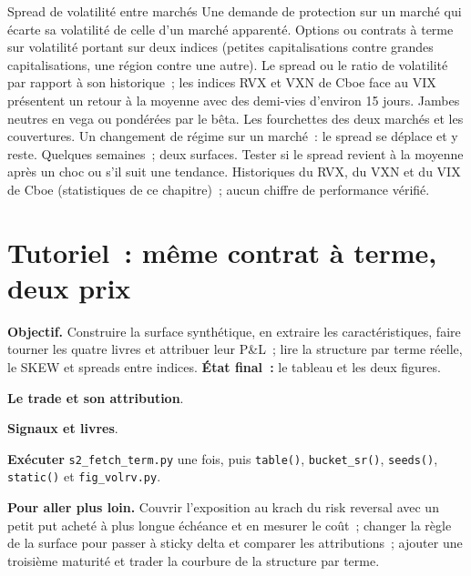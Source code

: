 \begin{strategyfile}{Spread de volatilité entre marchés}\label{strat:s2:skew-and-term-structure-relative-value:cross}
 Une demande de protection sur un marché qui écarte sa volatilité de celle d'un marché apparenté.
 Options ou contrats à terme sur volatilité portant sur deux indices (petites capitalisations contre grandes capitalisations, une région contre une autre).
 Le spread ou le ratio de volatilité par rapport à son historique~; les indices RVX et VXN de Cboe face au VIX présentent un retour à la moyenne avec des demi-vies d'environ 15 jours.
 Jambes neutres en vega ou pondérées par le bêta.
 Les fourchettes des deux marchés et les couvertures.
 Un changement de régime sur un marché~: le spread se déplace et y reste.
 Quelques semaines~; deux surfaces.
 Tester si le spread revient à la moyenne après un choc ou s'il suit une tendance.
 Historiques du RVX, du VXN et du VIX de Cboe (statistiques de ce chapitre)~; aucun chiffre de performance vérifié.
\end{strategyfile}

\section{Tutoriel~: même contrat à terme, deux prix}\label{tut:s2:skew-and-term-structure-relative-value:tut}

\begin{tutorial}
\textbf{Objectif.} Construire la surface synthétique, en extraire les caractéristiques, faire tourner les quatre livres et attribuer leur P\&L~; lire la structure par terme réelle, le SKEW et
spreads entre indices. \textbf{État final~:} le tableau et les deux figures.
\begin{tutsteps}
\item \textbf{Le trade et son attribution}.
\label{lst:s2:skew-and-term-structure-relative-value:pnl}
\item \textbf{Signaux et livres}.
\label{lst:s2:skew-and-term-structure-relative-value:books}
\item \textbf{Exécuter} \texttt{s2\_fetch\_term.py} une fois, puis \texttt{table()}, \texttt{bucket\_sr()}, \texttt{seeds()}, \texttt{static()} et
\texttt{fig\_volrv.py}.
\end{tutsteps}
\textbf{Pour aller plus loin.} Couvrir l'exposition au krach du risk reversal avec un petit put acheté à plus longue échéance et en mesurer le coût~; changer la
règle de la surface pour passer à sticky delta et comparer les attributions~; ajouter une troisième maturité et trader la courbure de la structure par terme.
\end{tutorial}

